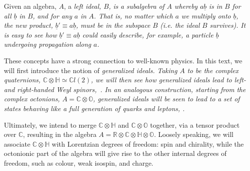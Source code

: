 \documentclass[letterpaper,12pt,titlepage,oneside,final]{book}
\newcommand{\CH}{\mathbb{C}\otimes\mathbb{H}}
\newcommand{\CO}{\mathbb{C}\otimes\mathbb{O}}
\newcommand{\RCHO}{\mathbb{R}\otimes\mathbb{C}\otimes\mathbb{H}\otimes\mathbb{O}}
\newcommand{\CLsix}{\mathbb{C}l(6)}
\newcommand{\CLtwo}{\mathbb{C}l(2)}
\newcommand{\CLfour}{\mathbb{C}l(4)}
\begin{document}
Given an algebra, $A$, a \it left ideal, \rm $B$, is a subalgebra of $A$ whereby $a \underline{b}$ is in $B$ for all $\underline{b}$ in $B$, and for any $a$ in $A$.  That is, no matter which $a$ we multiply onto $\underline{b}$, the new product, $\underline{b}'\equiv a\underline{b}$, must be in the subspace $B$ (i.e.  the ideal $B$ survives).  It is easy to see how $\underline{b}'\equiv a\underline{b}$ could easily describe, for example, a particle $\underline{b}$ undergoing propagation along $a$.



These concepts have a strong connection to well-known physics.  In this text, we will first introduce the notion of  \it generalized ideals. \rm Taking  $A$ to be the complex quaternions,  $\CH \simeq \CLtwo$, we will then see how generalized ideals lead to left- and right-handed Weyl spinors,~\cite{UTI}.  In an analogous construction, starting from the complex octonions, $A = \CO$, generalized ideals will be seen to lead to a set of states behaving like a full generation of quarks and leptons, \cite{qq}.

Ultimately, we intend to merge $\CH$ and $\CO$ together, via a tensor product over $\mathbb{C}$, resulting in the algebra $A=\RCHO$.  Loosely speaking, we will associate $\CH$ with Lorentzian degrees of freedom:  spin and chirality, while the octonionic part of the algebra will give rise to the other internal degrees of freedom, such as colour, weak isospin, and charge.
\end{document}
